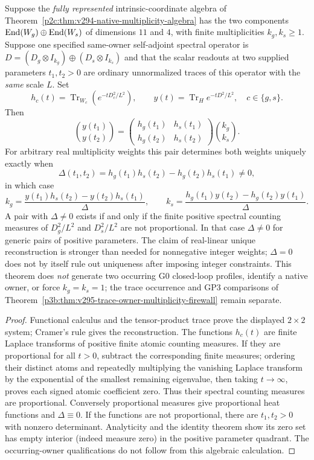 \documentclass[12pt,a4paper]{article}
\begin{document}
\begin{theorem}
\label{p3b:thm:v296-two-heat-multiplicity-reconstruction}
Suppose the \emph{fully represented} intrinsic-coordinate algebra of
Theorem~\ref{p2c:thm:v294-native-multiplicity-algebra} has the two
components $\operatorname{End}(W_g)\oplus\operatorname{End}(W_s)$ of dimensions $11$ and $4$,
with finite multiplicities $k_g,k_s\ge1$. Suppose one specified
same-owner self-adjoint spectral operator is
$D=(D_g\otimes I_{k_g})\oplus(D_s\otimes I_{k_s})$ and that the
scalar readouts at two supplied parameters $t_1,t_2>0$ are ordinary
unnormalized traces of this operator with the \emph{same} scale $L$.
Set
\[
 h_c(t)=\operatorname{Tr}_{W_c}\!\left(e^{-tD_c^2/L^2}\right),
 \qquad y(t)=\operatorname{Tr}_{H}e^{-tD^2/L^2},
 \quad c\in\{g,s\}.
\]
Then
\[
 \binom{y(t_1)}{y(t_2)}=
 \begin{pmatrix}h_g(t_1)&h_s(t_1)\\h_g(t_2)&h_s(t_2)\end{pmatrix}
 \binom{k_g}{k_s}.
\]
For arbitrary real multiplicity weights this pair determines both
weights uniquely exactly when
\[
 \Delta(t_1,t_2)=h_g(t_1)h_s(t_2)-h_g(t_2)h_s(t_1)\ne0,
\]
in which case
\[
 k_g=\frac{y(t_1)h_s(t_2)-y(t_2)h_s(t_1)}{\Delta},\qquad
 k_s=\frac{h_g(t_1)y(t_2)-h_g(t_2)y(t_1)}{\Delta}.
\]
A pair with $\Delta\ne0$ exists if and only if the finite positive
spectral counting measures of $D_g^2/L^2$ and $D_s^2/L^2$ are not
proportional. In that case $\Delta\ne0$ for generic pairs of positive
parameters. The claim of real-linear unique reconstruction is stronger
than needed for nonnegative integer weights; $\Delta=0$ does not by
itself rule out uniqueness after imposing integer constraints.
This theorem does \emph{not} generate two occurring G0 closed-loop
profiles, identify a native owner, or force $k_g=k_s=1$; the trace
occurrence and GP3 comparisons of
Theorem~\ref{p3b:thm:v295-trace-owner-multiplicity-firewall}
remain separate.
\end{theorem}
\begin{proof}
Functional calculus and the tensor-product trace prove the displayed
$2\times2$ system; Cramer's rule gives the reconstruction. The
functions $h_c(t)$ are finite Laplace transforms of positive finite
atomic counting measures. If they are proportional for all $t>0$,
subtract the corresponding finite measures; ordering their distinct
atoms and repeatedly multiplying the vanishing Laplace transform by
the exponential of the smallest remaining eigenvalue, then taking
$t\to\infty$, proves each signed atomic coefficient zero. Thus their
spectral counting measures are proportional. Conversely proportional
measures give proportional heat functions and $\Delta\equiv0$.
If the functions are not proportional, there are $t_1,t_2>0$ with
nonzero determinant. Analyticity and the identity theorem show its
zero set has empty interior (indeed measure zero) in the positive
parameter quadrant. The occurring-owner qualifications do not follow
from this algebraic calculation.
\end{proof}
\end{document}
